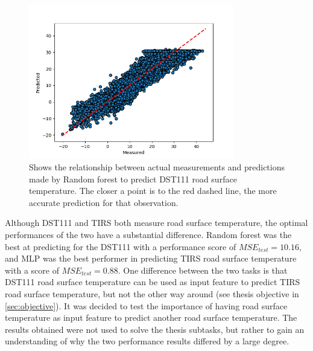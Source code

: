 \begin{figure}[H] 
	\centering
	\includegraphics[width=0.8\textwidth]{media/dst111_predictions.png}
	\caption{Shows the relationship between actual measurements and predictions made by Random forest to predict DST111 road surface temperature. The closer a point is to the red dashed line, the more accurate prediction for that observation. }
	\label{fig:scatter_dst111}
\end{figure}

	Although DST111 and TIRS both measure road surface temperature, the optimal performances of the two have a substantial difference. Random forest was the best at predicting for the DST111 with a performance score of $MSE_{test} = 10.16$, and MLP was the best performer in predicting TIRS road surface temperature with a score of $MSE_{test} = 0.88$. One difference between the two tasks is that DST111 road surface temperature can be used as input feature to predict TIRS road surface temperature, but not the other way around (see thesis objective in \ref{sec:objective}). It was decided to test the importance of having road surface temperature as input feature to predict another road surface temperature. The results obtained were not used to solve the thesis subtasks, but rather to gain an understanding of why the two performance results differed by a large degree.

